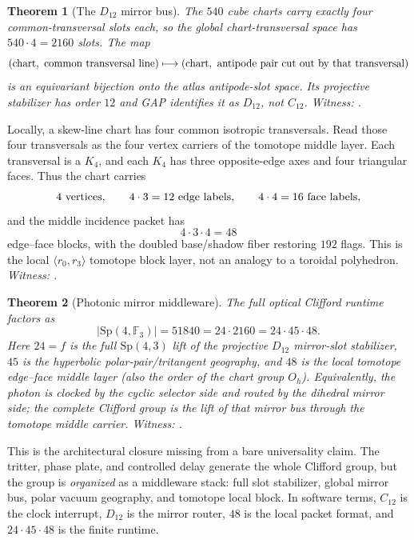 \documentclass[11pt]{article}
\newtheorem{theorem}{Theorem}[section]
\newcommand{\GF}[1]{\mathbb{F}_{#1}}
\newcommand{\Sp}{\mathrm{Sp}}
\begin{document}
\begin{theorem}[The $D_{12}$ mirror bus]
The $540$ cube charts carry exactly four common-transversal slots each,
so the global chart-transversal space has $540\cdot4=2160$ slots.  The
map
\[
(\hbox{chart},\hbox{ common transversal line})
\longmapsto
(\hbox{chart},\hbox{ antipode pair cut out by that transversal})
\]
is an equivariant bijection onto the atlas antipode-slot space.  Its
projective stabilizer has order $12$ and GAP identifies it as $D_{12}$,
not $C_{12}$.
\emph{Witness: .}
\end{theorem}

Locally, a skew-line chart has four common isotropic transversals.  Read
those four transversals as the four vertex carriers of the tomotope
middle layer.  Each transversal is a $K_4$, and each $K_4$ has three
opposite-edge axes and four triangular faces.  Thus the chart carries
\[
4 \hbox{ vertices},\qquad 4\cdot3=12 \hbox{ edge labels},\qquad
4\cdot4=16 \hbox{ face labels},
\]
and the middle incidence packet has
\[
4\cdot3\cdot4=48
\]
edge--face blocks, with the doubled base/shadow fiber restoring $192$
flags.  This is the local $\langle r_0,r_3\rangle$ tomotope block layer,
not an analogy to a toroidal polyhedron.
\emph{Witness: .}

\begin{theorem}[Photonic mirror middleware]
The full optical Clifford runtime factors as
\[
|\Sp(4,\GF3)| = 51840
              = 24\cdot2160
              = 24\cdot45\cdot48.
\]
Here $24=f$ is the full $\Sp(4,3)$ lift of the projective $D_{12}$
mirror-slot stabilizer, $45$ is the hyperbolic polar-pair/tritangent
geography, and $48$ is the local tomotope edge--face middle layer
(also the order of the chart group $O_h$).  Equivalently, the photon is
clocked by the cyclic selector side and routed by the dihedral mirror
side; the complete Clifford group is the lift of that mirror bus through
the tomotope middle carrier.
\emph{Witness: .}
\end{theorem}

This is the architectural closure missing from a bare universality
claim.  The tritter, phase plate, and controlled delay generate the
whole Clifford group, but the group is \emph{organized} as a middleware
stack: full slot stabilizer, global mirror bus, polar vacuum geography,
and tomotope local block.  In software terms, $C_{12}$ is the clock
interrupt, $D_{12}$ is the mirror router, $48$ is the local packet
format, and $24\cdot45\cdot48$ is the finite runtime.
\end{document}

